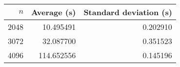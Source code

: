 \begin{tabular}{rrr}
$n$ & Average (s) & Standard deviation (s)\\\hline
2048 & 10.495491 & 0.202910\\
3072 & 32.087700 & 0.351523\\
4096 & 114.652556 & 0.145196\\
\end{tabular}

